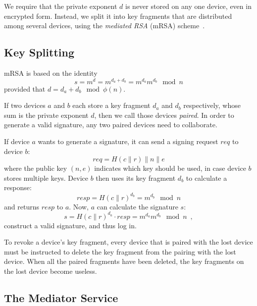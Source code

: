 \documentclass{llncs}
\newcommand*{\concat}{\mathbin{\|}}
\begin{document}
We require that the private exponent $d$ is never stored on any one device, even in encrypted form.
Instead, we split it into key fragments that are distributed among several devices, using the
\emph{mediated RSA} (mRSA) scheme~\cite{Boneh01,Kutyiowski12}.

\subsection{Key Splitting}\label{sec:splitting}

mRSA is based on the identity
\begin{equation}
s = m^d = m^{d_a + d_b} = m^{d_a} m^{d_b} \mod n
\end{equation}
provided that $d = d_a + d_b \mod \phi(n)$.

If two devices $a$ and $b$ each store a key fragment $d_a$ and $d_b$ respectively, whose sum is the
private exponent $d$, then we call those devices \emph{paired}. In order to generate a valid
signature, any two paired devices need to collaborate.

If device $a$ wants to generate a signature, it can send a signing request $\mathit{req}$ to device $b$:
\begin{equation}
\mathit{req} = H(c \concat r) \concat n \concat e
\end{equation}
where the public key $(n, e)$ indicates which key should be used, in case device $b$ stores multiple
keys. Device $b$ then uses its key fragment $d_b$ to calculate a response:
\begin{equation}
\mathit{resp} = H(c \concat r)^{d_b} = m^{d_b} \mod n
\end{equation}
and returns $\mathit{resp}$ to $a$. Now, $a$ can calculate the signature $s$:
\begin{equation}
s = H(c \concat r)^{d_a} \cdot \mathit{resp} = m^{d_a} m^{d_b} \mod n \enspace,
\end{equation}
construct a valid signature, and thus log in.

To revoke a device's key fragment, every device that is paired with the lost device must be
instructed to delete the key fragment from the pairing with the lost device. When all the paired
fragments have been deleted, the key fragments on the lost device become useless.

\subsection{The Mediator Service}\label{sec:mediator}
\end{document}
